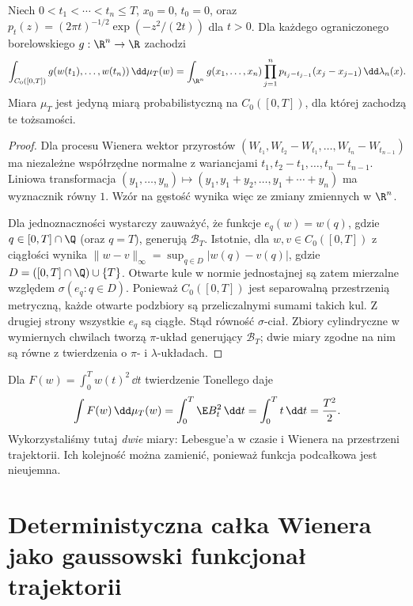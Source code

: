 \begin{twierdzenie}
\label{th:wiener-cyl}
Niech $0<t_1<\cdots<t_n\le T$, $x_0=0$, $t_0=0$, oraz
$p_t(z)=(2\pi t)^{-1/2}\exp(-z^2/(2t))$ dla $t>0$.
Dla każdego ograniczonego borelowskiego $g:\R^n\to\R$ zachodzi
\[
\int_{C_0([0,T])}g(w(t_1),\ldots,w(t_n))\,\dd\mu_T(w)
=\int_{\R^n}g(x_1,\ldots,x_n)
\prod_{j=1}^n p_{t_j-t_{j-1}}(x_j-x_{j-1})
\,\dd\lambda_n(x).
\]
Miara $\mu_T$ jest jedyną miarą probabilistyczną na
$C_0([0,T])$, dla której zachodzą te tożsamości.
\end{twierdzenie}
\begin{proof}
Dla procesu Wienera wektor przyrostów
$(W_{t_1},W_{t_2}-W_{t_1},\ldots,W_{t_n}-W_{t_{n-1}})$
ma niezależne współrzędne normalne z wariancjami
$t_1,t_2-t_1,\ldots,t_n-t_{n-1}$. Liniowa transformacja
$(y_1,\ldots,y_n)\mapsto(y_1,y_1+y_2,\ldots,y_1+\cdots+y_n)$
ma wyznacznik równy $1$. Wzór na gęstość wynika więc ze
zmiany zmiennych w $\R^n$.

Dla jednoznaczności wystarczy zauważyć, że funkcje
$e_q(w)=w(q)$, gdzie $q\in[0,T]\cap\Q$ (oraz $q=T$),
generują $\mathcal B_T$. Istotnie, dla $w,v\in C_0([0,T])$
z ciągłości wynika
$\|w-v\|_\infty=\sup_{q\in D}|w(q)-v(q)|$, gdzie
$D=([0,T]\cap\Q)\cup\{T\}$. Otwarte kule w normie
jednostajnej są zatem mierzalne względem
$\sigma(e_q:q\in D)$. Ponieważ $C_0([0,T])$ jest
separowalną przestrzenią metryczną, każde otwarte podzbiory
są przeliczalnymi sumami takich kul. Z drugiej strony
wszystkie $e_q$ są ciągłe. Stąd równość $\sigma$-ciał.
Zbiory cylindryczne w wymiernych chwilach tworzą
$\pi$-układ generujący $\mathcal B_T$; dwie miary
zgodne na nim są równe z twierdzenia o $\pi$- i $\lambda$-układach.
\end{proof}

\begin{przyklad}
Dla $F(w)=\int_0^T w(t)^2\,\dd t$ twierdzenie Tonellego daje
\[
\int F(w)\,\dd\mu_T(w)
=\int_0^T\E B_t^2\,\dd t
=\int_0^Tt\,\dd t=\frac{T^2}{2}.
\]
Wykorzystaliśmy tutaj \emph{dwie} miary: Lebesgue'a w czasie i
Wienera na przestrzeni trajektorii. Ich kolejność można zamienić,
ponieważ funkcja podcałkowa jest nieujemna.
\end{przyklad}

\section{Deterministyczna całka Wienera jako gaussowski funkcjonał trajektorii}

